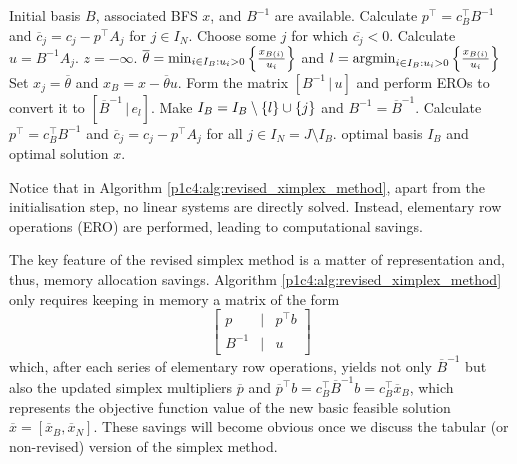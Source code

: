 \begin{algorithm}[h]
	\caption{Revised simplex method} \label{p1c4:alg:revised_ximplex_method}
	\begin{algorithmic}[1] %
	 Initial basis $B$, associated BFS $x$, and $B^{-1}$ are available.
	\State Calculate $p^\top = c_B^\top B^{-1}$ and $\overline{c}_j = c_j - p^\top A_j$ for $j \in I_N$.
	 \label{p1c4:alg:opt_condition_rev} 
	    \State Choose some $j$ for which $\overline{c_j} < 0$. Calculate $u = B^{-1}A_j$. 
	     \label{p1c4:alg:unb_condition_rev}
			 $z = -\infty$.		
		\Else
			\State $\overline{\theta} = \min_{i \in I_B : u_i > 0} \left\{ \frac{x_{B(i)}}{u_i} \right \}$ and $l = \mathop{\rm argmin}_{i \in I_B : u_i > 0} \left\{ \frac{x_{B(i)}}{u_i} \right \}$ 
			\State Set $x_j = \overline{\theta}$ and $x_B = x - \overline{\theta}u$.
			\State Form the matrix $[B^{-1} \,|\, u]$ and perform EROs to convert it to $[\overline{B}^{-1} \, | \, e_l]$. 
			\State Make $I_B = I_B \setminus \left\{ l \right \} \cup \left\{ j \right \}$ and $B^{-1} = \overline{B}^{-1}$. 
			\State Calculate $p^\top = c_B^\top B^{-1}$ and $\overline{c}_j = c_j - p^\top A_j$ for all $j \in I_N = J \setminus I_B$.
		\EndIf
	\EndWhile
	 optimal basis $I_B$ and optimal solution $x$.
	\end{algorithmic}
\end{algorithm}

Notice that in Algorithm \ref{p1c4:alg:revised_ximplex_method}, apart from the initialisation step, no linear systems are directly solved. Instead, elementary row operations (ERO) are performed, leading to computational savings.

The key feature of the revised simplex method is a matter of representation and, thus, memory allocation savings. Algorithm \ref{p1c4:alg:revised_ximplex_method} only requires keeping in memory a matrix of the form 
%
\begin{equation*}
	\begin{bmatrix}
		p & | & p^\top b \\
		B^{-1} & | & u	
	\end{bmatrix}
\end{equation*}
%  
which, after each series of elementary row operations, yields not only $\overline{B}^{-1}$ but also the updated simplex multipliers $\overline{p}$ and $\overline{p}^\top b = c_B^\top \overline{B}^{-1}b = c_B ^\top \overline{x}_B$, which represents the objective function value of the new basic feasible solution $\overline{x} = [\overline{x}_B, \overline{x}_N]$. These savings will become obvious once we discuss the tabular (or non-revised) version of the simplex method. 

